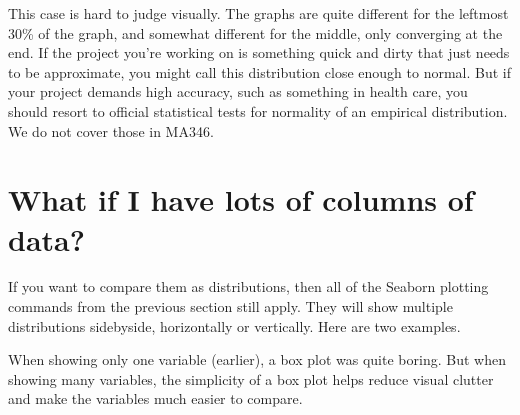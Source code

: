 \documentclass[letterpaper,10pt,english]{sphinxmanual}
\begin{document}
\noindent{}

This case is hard to judge visually.  The graphs are quite different for the leftmost 30\% of the graph, and somewhat different for the middle, only converging at the end.  If the project you’re working on is something quick and dirty that just needs to be approximate, you might call this distribution close enough to normal.  But if your project demands high accuracy, such as something in health care, you should resort to official statistical tests for normality of an empirical distribution.  We do not cover those in MA346.


\section{What if I have lots of columns of data?}
\label{\detokenize{chapter-10-visualization:what-if-i-have-lots-of-columns-of-data}}
If you want to compare them as distributions, then all of the Seaborn plotting commands from the previous section still apply.  They will show multiple distributions side\sphinxhyphen{}by\sphinxhyphen{}side, horizontally or vertically.  Here are two examples.

\begin{sphinxVerbatim}[commandchars=\\\{\}]
    
  
  
\end{sphinxVerbatim}

\noindent{}

When showing only one variable (earlier), a box plot was quite boring.  But when showing many variables, the simplicity of a box plot helps reduce visual clutter and make the variables much easier to compare.

\begin{sphinxVerbatim}[commandchars=\\\{\}]
    
  
  
\end{sphinxVerbatim}
\end{document}
